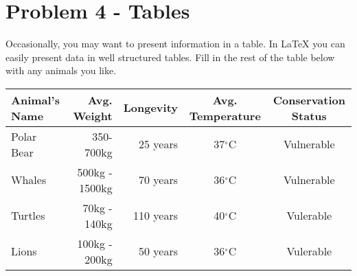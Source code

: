 \documentclass[12pt]{article}
\begin{document}
\begin{center}
\end{center}

\section*{Problem 4 - Tables}
Occasionally, you may want to present information in a table. In \LaTeX{} you can easily
 present data in well structured tables. 
Fill in the rest of the table below with any animals you like.\\

 

\begin{tabular}{ | l || r  | r | c | c |} \hline
  Animal's Name & Avg. Weight & Longevity & Avg. Temperature & Conservation Status  \\ \hline
   Polar Bear & 350-700kg & 25 years & 37$^{\circ}$C  & Vulnerable \\ \hline
    Whales & 500kg - 1500kg & 70 years & 36$^{\circ}$C & Vulnerable \\ \hline
    Turtles & 70kg - 140kg & 110 years & 40$^{\circ}$C  & Vulerable\\ \hline
    Lions & 100kg - 200kg & 50 years & 36$^{\circ}$C & Vulerable \\ \hline
\end{tabular}
\end{document}

